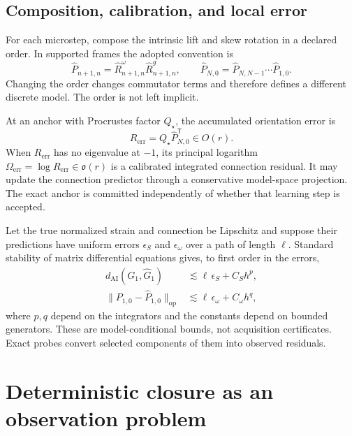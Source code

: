 \documentclass[10pt,twocolumn]{article}
\theoremstyle{definition}
\theoremstyle{remark}
\newcommand{\op}{\mathrm{op}}
\begin{document}
\subsection{Composition, calibration, and local error}

For each microstep, compose the intrinsic lift and skew rotation in a declared
order.  In supported frames the adopted convention is
\begin{equation}
 \widehat P_{n+1,n}
 =\widehat R^\omega_{n+1,n}\widehat R^g_{n+1,n},\qquad
 \widehat P_{N,0}=\widehat P_{N,N-1}\cdots\widehat P_{1,0}.
 \label{eq:appcomposition}
\end{equation}
Changing the order changes commutator terms and therefore defines a different
discrete model.  The order is not left implicit.

At an anchor with Procrustes factor $Q_\star$, the accumulated orientation
error is
\begin{equation}
 R_{\mathrm{err}}=Q_\star\widehat P_{N,0}^{\mathsf T}\in O(r).
 \label{eq:apporientationerror}
\end{equation}
When $R_{\mathrm{err}}$ has no eigenvalue at $-1$, its principal logarithm
$\Omega_{\mathrm{err}}=\log R_{\mathrm{err}}\in\mathfrak o(r)$ is a calibrated
integrated connection residual.  It may update the connection predictor
through a conservative model-space projection.  The exact anchor is committed
independently of whether that learning step is accepted.

Let the true normalized strain and connection be Lipschitz and suppose their
predictions have uniform errors $\epsilon_S$ and $\epsilon_\omega$ over a path
of length $\ell$.  Standard stability of matrix differential equations gives,
to first order in the errors,
\begin{align}
 d_{\mathrm{AI}}(G_1,\widehat G_1)
 &\lesssim \ell\,\epsilon_S+C_S h^p,\nonumber\\
 \|P_{1,0}-\widehat P_{1,0}\|_{\op}
 &\lesssim \ell\,\epsilon_\omega+C_\omega h^q ,
 \label{eq:apppredictorerror}
\end{align}
where $p,q$ depend on the integrators and the constants depend on bounded
generators.  These are model-conditional bounds, not acquisition certificates.
Exact probes convert selected components of them into observed residuals.

\section{Deterministic closure as an observation problem}
\label{app:closuredetails}
\end{document}
